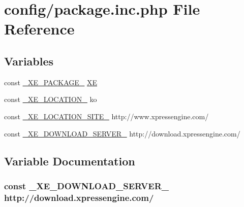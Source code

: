 \hypertarget{package_8inc_8php}{}\section{config/package.inc.\+php File Reference}
\label{package_8inc_8php}
\subsection*{Variables}
\begin{DoxyCompactItemize}
\item 
const \hyperlink{package_8inc_8php_ac4384cdc784342cd44d75952334decb4}{\+\_\+\+X\+E\+\_\+\+P\+A\+C\+K\+A\+G\+E\+\_\+} \textquotesingle{}\hyperlink{common_8js_aaa263f22ef2edb148749b6e2ffeeeba0}{XE}\textquotesingle{}
\item 
const \hyperlink{package_8inc_8php_a7330debbfb3a027cdd5f3d3dd1dfbdd0}{\+\_\+\+X\+E\+\_\+\+L\+O\+C\+A\+T\+I\+O\+N\+\_\+} \textquotesingle{}ko\textquotesingle{}
\item 
const \hyperlink{package_8inc_8php_a063bfd2eb9f811b1676d0dbc0cad2648}{\+\_\+\+X\+E\+\_\+\+L\+O\+C\+A\+T\+I\+O\+N\+\_\+\+S\+I\+T\+E\+\_\+} \textquotesingle{}http\+://www.\+xpressengine.\+com/\textquotesingle{}
\item 
const \hyperlink{package_8inc_8php_a22df32d3e0eae0d60d6cddb9ec99d5ec}{\+\_\+\+X\+E\+\_\+\+D\+O\+W\+N\+L\+O\+A\+D\+\_\+\+S\+E\+R\+V\+E\+R\+\_\+} \textquotesingle{}http\+://download.\+xpressengine.\+com/\textquotesingle{}
\end{DoxyCompactItemize}


\subsection{Variable Documentation}
\subsubsection[{\texorpdfstring{\+\_\+\+X\+E\+\_\+\+D\+O\+W\+N\+L\+O\+A\+D\+\_\+\+S\+E\+R\+V\+E\+R\+\_\+}{_XE_DOWNLOAD_SERVER_}}]{\setlength{\rightskip}{0pt plus 5cm}const \+\_\+\+X\+E\+\_\+\+D\+O\+W\+N\+L\+O\+A\+D\+\_\+\+S\+E\+R\+V\+E\+R\+\_\+ \textquotesingle{}http\+://download.\+xpressengine.\+com/\textquotesingle{}}\hypertarget{package_8inc_8php_a22df32d3e0eae0d60d6cddb9ec99d5ec}{}\label{package_8inc_8php_a22df32d3e0eae0d60d6cddb9ec99d5ec}


